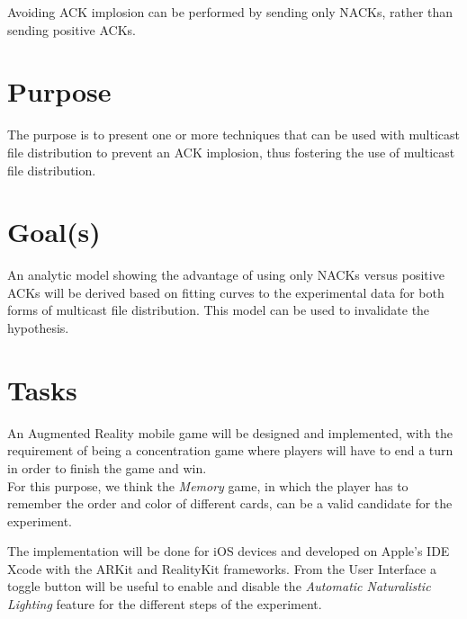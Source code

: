 \documentclass[12pt,twoside,english]{article}
\begin{document}
Avoiding \gls{ACK} implosion can be performed by sending only \glspl{NACK}, rather than sending positive \glspl{ACK}.

\section{Purpose}
\label{sect:purpose}

The purpose is to present one or more techniques that can be used with multicast file distribution to prevent an \gls{ACK} implosion, thus fostering the use of multicast file distribution.

\section{Goal(s)}
\label{sect:goals}

An analytic model showing the advantage of using only \glspl{NACK} versus positive \glspl{ACK} will be derived based on fitting curves to the experimental data for both forms of multicast file distribution. This model can be used to invalidate the hypothesis.

\section{Tasks}
\label{sect:tasks}

An Augmented Reality mobile game will be designed and implemented, with the requirement of being a concentration game where players will have to end a turn in order to finish the game and win. \\For this purpose, we think the \textit{Memory} game, in which the player has to remember the order and color of different cards, can be a valid candidate for the experiment.

The implementation will be done for iOS devices and developed on Apple's IDE Xcode with the ARKit and RealityKit frameworks. From the User Interface a toggle button will be useful to enable and disable the \emph{Automatic Naturalistic Lighting} feature for the different steps of the experiment. \\
\end{document}
